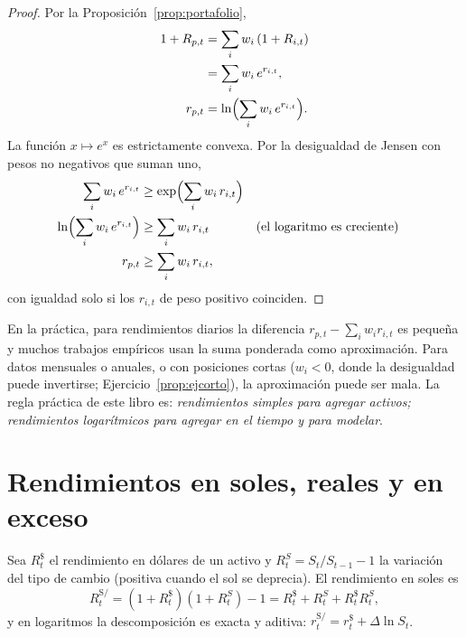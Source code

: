 \begin{proof}
Por la Proposición~\ref{prop:portafolio},
\begin{align*}
  1+R_{p,t} &= \sum_iw_i\,(1+R_{i,t})\\
            &= \sum_iw_i\,e^{r_{i,t}},\\
  r_{p,t}   &= \ln\Bigl(\sum_iw_i\,e^{r_{i,t}}\Bigr).
\end{align*}
La función $x\mapsto e^x$ es estrictamente convexa. Por la desigualdad de Jensen con pesos no negativos
que suman uno,
\begin{align*}
  \sum_iw_i\,e^{r_{i,t}} &\ge \exp\Bigl(\sum_iw_i\,r_{i,t}\Bigr)\\
  \ln\Bigl(\sum_iw_i\,e^{r_{i,t}}\Bigr) &\ge \sum_iw_i\,r_{i,t} && \text{(el logaritmo es creciente)}\\
  r_{p,t} &\ge \sum_iw_i\,r_{i,t},
\end{align*}
con igualdad solo si los $r_{i,t}$ de peso positivo coinciden.
\end{proof}

\begin{observacion}
En la práctica, para rendimientos diarios la diferencia $r_{p,t}-\sum_iw_ir_{i,t}$ es pequeña y muchos
trabajos empíricos usan la suma ponderada como aproximación. Para datos mensuales o anuales, o con
posiciones cortas ($w_i<0$, donde la desigualdad puede invertirse; Ejercicio~\ref{prop:ejcorto}), la
aproximación puede ser mala. La regla práctica de este libro es: \emph{rendimientos simples para
agregar activos; rendimientos logarítmicos para agregar en el tiempo y para modelar}.
\end{observacion}

\section{Rendimientos en soles, reales y en exceso}

\begin{proposicion}\label{prop:moneda}
Sea $R^{\$}_t$ el rendimiento en dólares de un activo y $R^{S}_t=S_t/S_{t-1}-1$ la variación del tipo
de cambio (positiva cuando el sol se deprecia). El rendimiento en soles es
\[
  R^{\mathrm{S/}}_t=(1+R^{\$}_t)(1+R^{S}_t)-1=R^{\$}_t+R^{S}_t+R^{\$}_tR^{S}_t,
\]
y en logaritmos la descomposición es exacta y aditiva: $r^{\mathrm{S/}}_t=r^{\$}_t+\Delta\ln S_t$.
\end{proposicion}

